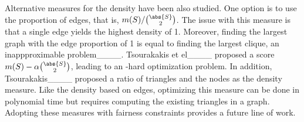 Alternative measures for the density have been also studied. One
 option is to use the proportion of edges, that is, $m(S) / {\abs {S}  \choose 2}$. The issue with this measure is that a single edge yields the highest density of 1. Moreover, finding the largest graph with the edge proportion of 1 is equal to finding the largest clique, an inappproximable problem____.
 Tsourakakis et el____ proposed a score $m(S) - \alpha {\abs {S} \choose 2}$, leading to an \np-hard optimization problem. In addition, Tsourakakis____ proposed a ratio of triangles 
 and the nodes as the density measure. Like the density based on edges, optimizing
 this measure can be done in polynomial time but requires computing the existing triangles in a graph. Adopting these measures with fairness constraints provides a future line of work.










